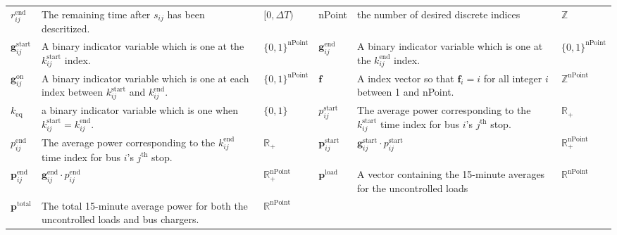 \begin{center}
\begin{singlespace}
\begin{supertabular}{b{0.08\textwidth} m{0.3\textwidth} m{0.09\textwidth} m{0.08\textwidth} m{0.3\textwidth} m{0.09\textwidth}}
	$r_{ij}^{\text{end}}$            & The remaining time after $s_{ij}$ has been descritized.                                                           & $[0,\Delta T)$                 & nPoint                           & the number of desired discrete indices                                                                        & $\mathbb{Z}$                    \\ \myendline
	$\mathbf{g}_{ij}^{\text{start}}$ & A binary indicator variable which is one at the $k_{ij}^{\text{start}}$ index.                                    & $\{0,1\}^{\text{nPoint}}$      & $\mathbf{g}_{ij}^{\text{end}}$   & A binary indicator variable which is one at the $k_{ij}^{\text{end}}$ index.                                  & $\{0,1\}^{\text{nPoint}}$       \\ \myendline
	$\mathbf{g}_{ij}^{\text{on}}$    & A binary indicator variable which is one at each index between $k_{ij}^{\text{start}}$ and $k_{ij}^{\text{end}}$. & $\{0,1\}^{\text{nPoint}}$      & $\mathbf{f}$                     & A index vector so that $\mathbf{f}_i = i$ for all integer $i$ between 1 and nPoint.                           & $\mathbb{Z}^{\text{nPoint}}$    \\ \myendline
	$k_{\text{eq}}$                  & a binary indicator variable which is one when $k_{ij}^{\text{start}} = k_{ij}^{\text{end}}$.                      & $\{0,1\}$                      & $p_{ij}^{\text{start}}$          & The average power corresponding to the $k_{ij}^{\text{start}}$ time index for bus $i$'s $j^{\text{th}}$ stop. & $\mathbb{R}_+$                  \\ \myendline
	$p_{ij}^{\text{end}}$            & The average power corresponding to the $k_{ij}^{\text{end}}$ time index for bus $i$'s $j^{\text{th}}$ stop.       & $\mathbb{R}_+$                 & $\mathbf{p}_{ij}^{\text{start}}$ & $\mathbf{g}_{ij}^{\text{start}}\cdot p_{ij}^{\text{start}}$                                                   & $\mathbb{R}_+^{\text{nPoint}}$  \\ \myendline
	$\mathbf{p}_{ij}^{\text{end}}$   & $\mathbf{g}_{ij}^{\text{end}}\cdot p_{ij}^{\text{end}}$                                                           & $\mathbb{R}_+^{\text{nPoint}}$ & $\mathbf{p}^{\text{load}}$       & A vector containing the 15-minute averages for the uncontrolled loads                                         & $\mathbb{R}^{\text{nPoint}}$    \\ \myendline
	$\mathbf{p}^{\text{total}}$      & The total 15-minute average power for both the uncontrolled loads and bus chargers.                               & $\mathbb{R}^{\text{nPoint}}$   \\[0.3in] 

\end{supertabular}
\end{singlespace}
\end{center}
